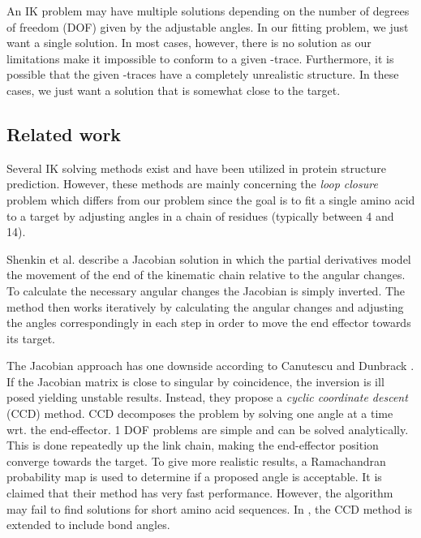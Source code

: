 An IK problem may have multiple solutions depending on the number of degrees of freedom (DOF) given by the adjustable angles.
In our fitting problem, we just want a single solution.
In most cases, however, there is no solution as our limitations make it impossible to conform to a given \Ca-trace.
Furthermore, it is possible that the given \Ca-traces have a completely unrealistic structure.
In these cases, we just want a solution that is somewhat close to the target.


\subsection{Related work}
Several IK solving methods exist and have been utilized in protein structure prediction.
However, these methods are mainly concerning the \emph{loop closure} problem \cite{coutsias2004kinematic} which differs from our problem since the goal is to fit a single amino acid to a target by adjusting angles in a chain of residues (typically between 4 and 14).
  
Shenkin et al. describe a Jacobian solution in which the partial derivatives model the movement of the end of the kinematic chain relative to the angular changes\cite{shenkin1987}.
To calculate the necessary angular changes the Jacobian is simply inverted.
The method then works iteratively by calculating the angular changes and adjusting the angles correspondingly in each step in order to move the end effector towards its target.

The Jacobian approach has one downside according to Canutescu and Dunbrack
\cite{canutescu2003}.
If the Jacobian matrix is close to singular by coincidence, the inversion is ill posed yielding unstable results.
Instead, they propose a \emph{cyclic coordinate descent} (CCD) method.
CCD decomposes the problem by solving one angle at a time wrt. the end-effector.
1 DOF problems are simple and can be solved analytically.
This is done repeatedly up the link chain, making the end-effector position converge towards the target.
To give more realistic results, a Ramachandran probability map is used to determine if a proposed angle is acceptable. 
It is claimed that their method has very fast performance. 
However, the algorithm may fail to find solutions for short amino acid sequences.
In \cite{boomsma2005full}, the CCD method is extended to include bond angles.

